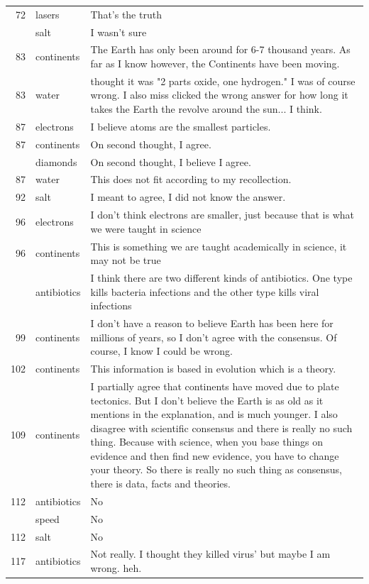 \documentclass[
  doc,floatsintext]{apa6}
\begin{document}
\begin{longtable}[t]{>{}r>{}l>{\raggedright\arraybackslash}p{30em}}
72 & lasers & That’s the truth\\
\addlinespace
72 & salt & I wasn’t sure\\
83 & continents & The Earth has only been around for 6-7 thousand years. As far as I know however, the Continents have been moving.\\
83 & water & thought it was "2 parts oxide, one hydrogen." I was of course wrong. I also miss clicked the wrong answer for how long it takes the Earth the revolve around the sun... I think.\\
87 & electrons & I believe atoms are the smallest particles.\\
87 & continents & On second thought, I agree.\\
\addlinespace
87 & diamonds & On second thought, I believe I agree.\\
87 & water & This does not fit according to my recollection.\\
92 & salt & I meant to agree, I did not know the answer.\\
96 & electrons & I don't think electrons are smaller, just because that is what we were taught in science\\
96 & continents & This is something we are taught academically in science, it may not be true\\
\addlinespace
98 & antibiotics & I think there are two different kinds of antibiotics. One type kills bacteria infections and the other type kills viral infections\\
99 & continents & I don't have a reason to believe Earth has been here for millions of years, so I don't agree with the consensus. Of course, I know I could be wrong.\\
102 & continents & This information is based in evolution which is a theory.\\
109 & continents & I partially agree that continents have moved due to plate tectonics. But I don't believe the Earth is as old as it mentions in the explanation, and is much younger. I also disagree with scientific consensus and there is really no such thing. Because with science, when you base things on evidence and then find new evidence, you have to change your theory. So there is really no such thing as consensus, there is data, facts and theories.\\
112 & antibiotics & No\\
\addlinespace
112 & speed & No\\
112 & salt & No\\
117 & antibiotics & Not really. I thought they killed virus' but maybe I am wrong. heh.\\

\end{longtable}
\end{document}
